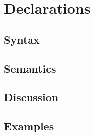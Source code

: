 \section{Declarations}

\subsection{Syntax}

\subsection{Semantics}

\subsection{Discussion}

\subsection{Examples}

